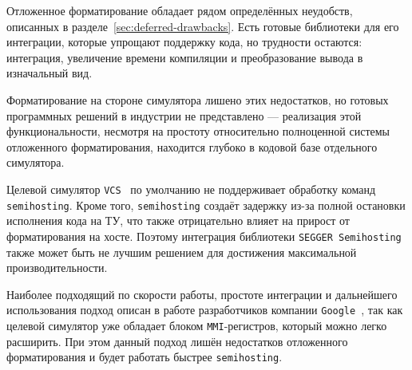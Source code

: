 Отложенное форматирование обладает рядом определённых неудобств, описанных в разделе~\ref{sec:deferred-drawbacks}. Есть готовые библиотеки для его интеграции, которые упрощают поддержку кода, но трудности остаются: интеграция, увеличение времени компиляции и преобразование вывода в изначальный вид.

Форматирование на стороне симулятора лишено этих недостатков, но готовых программных решений в индустрии не представлено --- реализация этой функциональности, несмотря на простоту относительно полноценной системы отложенного форматирования, находится глубоко в кодовой базе отдельного симулятора.

Целевой симулятор \texttt{VCS}~\cite{VcsUserGuide} по умолчанию не поддерживает обработку команд \texttt{semihosting}. Кроме того, \texttt{semihosting} создаёт задержку из-за полной остановки исполнения кода на ТУ, что также отрицательно влияет на прирост от форматирования на хосте. Поэтому интеграция библиотеки \texttt{SEGGER Semihosting}~\cite{SeggerSemihost} также может быть не лучшим решением для достижения максимальной производительности.

Наиболее подходящий по скорости работы, простоте интеграции и дальнейшего использования подход описан в работе разработчиков компании \texttt{Google}~\cite{Keller26HostPrintf}, так как целевой симулятор уже обладает блоком \texttt{MMI}-регистров, который можно легко расширить. При этом данный подход лишён недостатков отложенного форматирования и будет работать быстрее \texttt{semihosting}.
